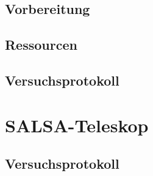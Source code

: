 \documentclass[
    twoside=true, 
    footinclude=off, 
    captions=tableheading, 
    DIV=12;usenames,
    dvipsnames
]{scrbook}
\begin{document}
    \newpage
    \section{Vorbereitung}
        

    \newpage
    \section{Ressourcen}
        

    \newpage
    \section{Versuchsprotokoll}
        

\chapter{SALSA-Teleskop}
    \section{Versuchsprotokoll}
        

    




%
\end{document}
